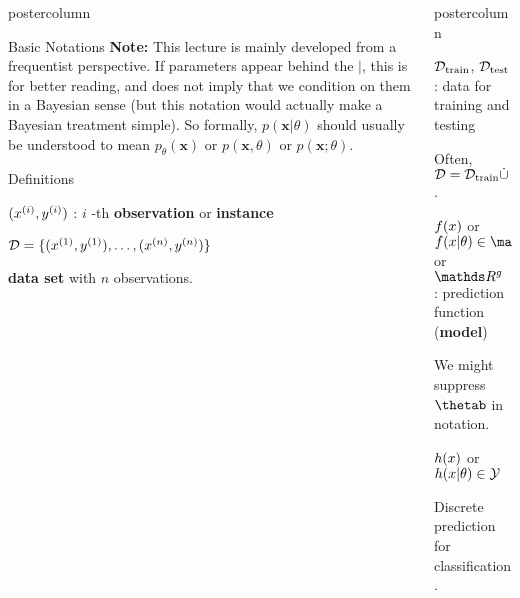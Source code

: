 \documentclass{beamer}
\newlength{\columnheight} %
\begin{document}
\begin{frame}[fragile]{}
\begin{columns}
\begin{column}{.31\textwidth}
\begin{beamercolorbox}[center]{postercolumn}
\begin{minipage}{.98\textwidth}
{\begin{myblock}{Basic Notations}
						\textbf{Note:} This lecture is mainly developed from a frequentist perspective. If parameters appear behind the $|$, this is for better reading, and does not imply that we condition on them in a Bayesian sense (but this notation would actually make a Bayesian treatment simple). So formally, $p(\mathbf{x} | \theta)$ should usually be understood to mean $p_\theta(\mathbf{x})$ or $p(\mathbf{x}, \theta)$ or $p(\mathbf{x}; \theta)$.

					\end{myblock}
					\begin{myblock}{Definitions}
						\begin{codebox}
							$(x^{(i)}, y^{(i)})$ : $i$ -th \textbf{observation} or \textbf{instance}
						\end{codebox}
					
						\begin{codebox}
						$\mathcal{D} = \{ (x^{(1)}, y^{(1)}), \ldots, (x^{(n)}, y^{(n)})\}$
						\end{codebox}
						\hspace*{1ex}\textbf{data set} with $n$ observations.
					\end{myblock}\vfill
				}
			\end{minipage}
		\end{beamercolorbox}
	\end{column}
	\begin{column}{.31\textwidth}
		\begin{beamercolorbox}[center]{postercolumn}
			\begin{minipage}{.98\textwidth}
				\parbox[t][\columnheight]{\textwidth}{
					\begin{myblock}{}
						\begin{codebox}
							$\mathcal{D}_{\text{train}}$, $\mathcal{D}_{\text{test}}$ : data for training and testing
						\end{codebox}
						\hspace*{1ex}Often, $\mathcal{D} = \mathcal{D}_{\text{train}} \dot{\cup} ~ \mathcal{D}_{\text{test}}$.
						
						\begin{codebox}
							$f(x)$ or $\fxt \in \R$ or $\R^g$ : prediction function (\textbf{model}) %
						\end{codebox}
						\hspace*{1ex}We might suppress $\thetab$ in notation.
						
						\begin{codebox}
							 $h(x)$ or $h(x | \theta) \in \mathcal{Y}$
						\end{codebox}
						\hspace*{1ex}Discrete prediction for classification.
						

\end{myblock}}
\end{minipage}
\end{beamercolorbox}
\end{column}
\end{columns}
\end{frame}
\end{document}
